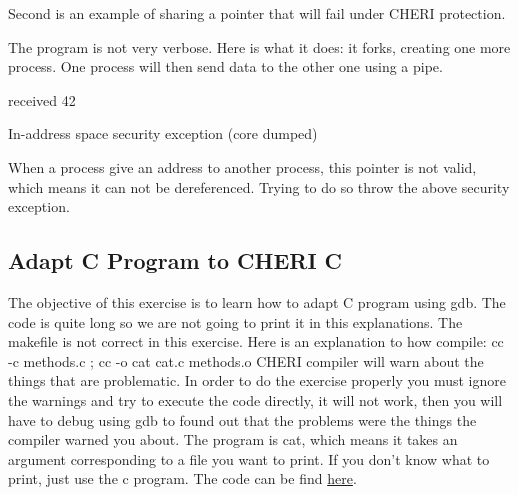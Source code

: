 \documentclass[a4paper, 11pt]{article}
\begin{document}
		
		Second is an example of sharing a pointer that will fail under CHERI protection.
		
	
	
		The program is not very verbose. Here is what it does: it forks, creating one more process. One process will then send data to the other one using a pipe.
		\begin{tcolorbox}[colback=gray!5!white, colframe=blue!75!black, title=Execution of long transmission on CHERI environment]
			received 42
		\end{tcolorbox}
		\begin{tcolorbox}[colback=gray!5!white, colframe=blue!75!black, title=Execution of ptr transmission on CHERI environment]
			In-address space security exception (core dumped)
		\end{tcolorbox}
		When a process give an address to another process, this pointer is not valid, which means it can not be dereferenced. Trying to do so throw the above security exception.
	
	\subsection{Adapt C Program to CHERI C}
		The objective of this exercise is to learn how to adapt C program using gdb.
		The code is quite long so we are not going to print it in this explanations.
		The makefile is not correct in this exercise. Here is an explanation to how compile:
		cc -c methods.c ; 
		cc -o cat cat.c methods.o
		CHERI compiler will warn about the things that are problematic. In order to do the exercise properly you must ignore the warnings and try to execute the code directly, it will not work, then you will have to debug using gdb to found out that the problems were the things the compiler warned you about.
		The program is cat, which means it takes an argument corresponding to a file you want to print.
		If you don't know what to print, just use the c program.
		The code can be find \href{https://ctsrd-cheri.github.io/cheri-exercises/exercises/adapt-c/index.html}{here}.
	
\end{document}
